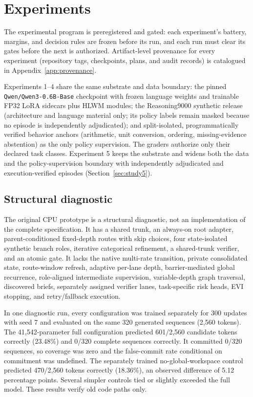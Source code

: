 \documentclass[10pt,a4paper]{article}
\begin{document}
\section{Experiments}
\label{sec:experiments}

The experimental program is preregistered and gated: each experiment's
battery, margins, and decision rules are frozen before its run, and each
run must clear its gates before the next is authorized. Artifact-level
provenance for every experiment (repository tags, checkpoints, plans, and
audit records) is catalogued in Appendix~\ref{app:provenance}.


Experiments 1--4 share the same substrate and data boundary: the pinned
\texttt{Qwen/Qwen3-0.6B-Base} checkpoint with frozen language weights and
trainable FP32 LoRA sidecars plus HLWM modules; the Reasoning9000 synthetic
release (architecture and language material only; its policy labels remain
masked because no episode is independently adjudicated); and split-isolated,
programmatically verified behavior anchors (arithmetic, unit conversion,
ordering, missing-evidence abstention) as the only policy supervision. The
graders authorize only their declared task classes. Experiment 5 keeps the
substrate and widens both the data and the policy-supervision boundary with
independently adjudicated and execution-verified episodes
(Section~\ref{sec:study5}).

\subsection{Structural diagnostic}

The original CPU prototype is a structural diagnostic, not an implementation
of the complete specification. It has a shared trunk, an always-on root
adapter, parent-conditioned fixed-depth routes with skip choices, four
state-isolated synthetic branch roles, iterative categorical refinement, a
shared-trunk verifier, and an atomic gate. It lacks the native multi-rate
transition, private consolidated state, route-window refresh, adaptive
per-lane depth, barrier-mediated global recurrence, role-aligned intermediate
supervision, variable-depth graph traversal, discovered briefs, separately
assigned verifier lanes, task-specific risk heads, EVI stopping, and
retry/fallback execution.

In one diagnostic run, every configuration was trained separately for 300
updates with seed 7 and evaluated on the same 320 generated sequences (2,560
tokens). The 41,542-parameter full configuration predicted 601/2,560 candidate
tokens correctly (23.48\%) and 0/320 complete sequences correctly. It
committed 0/320 sequences, so coverage was zero and the false-commit rate
conditional on commitment was undefined. The separately trained
no-global-workspace control predicted 470/2,560 tokens correctly (18.36\%),
an observed difference of 5.12 percentage points. Several simpler controls
tied or slightly exceeded the full model. These results verify old code paths
only.
\end{document}
